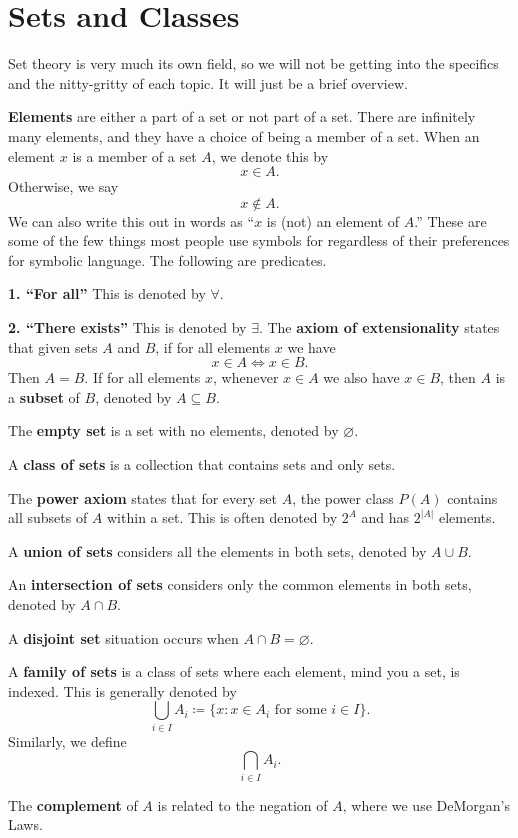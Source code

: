 
\section{Sets and Classes}

Set theory is very much its own field, so we will not be getting into the specifics and the nitty-gritty of each topic.
It will just be a brief overview.

\begin{definition}
    \textbf{Elements} are either a part of a set or not part of a set.
    There are infinitely many elements, and they have a choice of being a member of a set.
    When an element $x$ is a member of a set $A$, we denote this by
    \[
        x \in A.
    \]
    Otherwise, we say
    \[
        x \notin A.
    \]
    We can also write this out in words as ``$x$ is (not) an element of $A$.''
    These are some of the few things most people use symbols for regardless of their preferences for symbolic language.
    The following are predicates.

    \textbf{1. ``For all''}
    This is denoted by $\forall$.

    \textbf{2. ``There exists''}
    This is denoted by $\exists$.
    The \textbf{axiom of extensionality} states that given sets $A$ and $B$, if for all elements $x$ we have
    \[
        x \in A \iff x \in B.
    \]
    Then $A = B$.
    If for all elements $x$, whenever $x \in A$ we also have $x \in B$, then $A$ is a \textbf{subset} of $B$, denoted by $A \subseteq B$.

    The \textbf{empty set} is a set with no elements, denoted by $\varnothing$.

    A \textbf{class of sets} is a collection that contains sets and only sets.

    The \textbf{power axiom} states that for every set $A$, the power class $P(A)$ contains all subsets of $A$ within a set.
    This is often denoted by $2^A$ and has $2^{|A|}$ elements.

    A \textbf{union of sets} considers all the elements in both sets, denoted by $A \cup B$.

    An \textbf{intersection of sets} considers only the common elements in both sets, denoted by $A \cap B$.

    A \textbf{disjoint set} situation occurs when $A \cap B = \varnothing$.

    A \textbf{family of sets} is a class of sets where each element, mind you a set, is indexed.
    This is generally denoted by
    \[
        \bigcup_{i \in I} A_i \coloneqq \{x : x \in A_i \text{ for some } i \in I\}.
    \]
    Similarly, we define
    \[
        \bigcap_{i \in I} A_i.
    \]

    The \textbf{complement} of $A$ is related to the negation of $A$, where we use DeMorgan's Laws.
\end{definition}